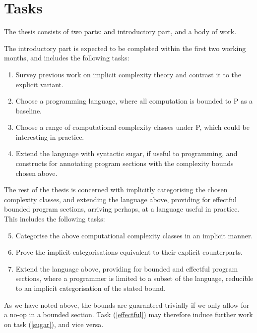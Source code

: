 
\section{Tasks}

The thesis consists of two parts: and introductory part, and a body of work.

The introductory part is expected to be completed within the first two working
months, and includes the following tasks:

\begin{enumerate}[(1)]

\item Survey previous work on implicit complexity theory and contrast it to the
explicit variant.

\item Choose a programming language, where all computation is bounded to P as a
baseline.

\item Choose a range of computational complexity classes under P, which could
be interesting in practice.

\item Extend the language with syntactic sugar, if useful to programming, and
constructs for annotating program sections with the complexity bounds chosen
above.\label{sugar}

\end{enumerate}

The rest of the thesis is concerned with implicitly categorising the chosen
complexity classes, and extending the language above, providing for effectful
bounded program sections, arriving perhaps, at a language useful in practice.
This includes the following tasks:

\begin{enumerate}[(1)]

\setcounter{enumi}{4}

\item Categorise the above computational complexity classes in an implicit
manner.

\item Prove the implicit categorisations equivalent to their explicit
counterparts.

\item Extend the language above, providing for bounded and effectful program
sections, where a programmer is limited to a subset of the language, reducible
to an implicit categorisation of the stated bound.\label{effectful}

\end{enumerate}

As we have noted above, the bounds are guaranteed trivially if we only allow
for a no-op in a bounded section. Task (\ref{effectful}) may therefore induce
further work on task (\ref{sugar}), and vice versa.
